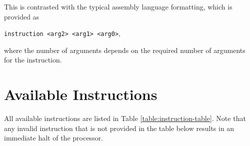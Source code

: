 \documentclass{article}
\begin{document}
This is contrasted with the typical assembly language formatting, which is provided as

\begin{center}
	\texttt{instruction <arg2> <arg1> <arg0>},
\end{center}

where the number of arguments depends on the required number of arguments for the instruction.

\pagebreak

\section{Available Instructions}

All available instructions are listed in Table \ref{table:instruction-table}. Note that any invalid instruction that is not provided in the table below results in an immediate halt of the processor.
\end{document}
